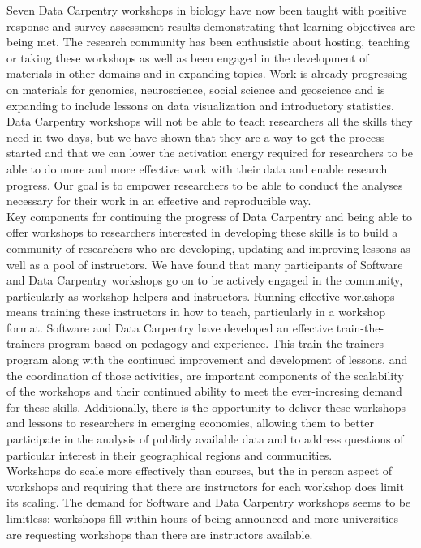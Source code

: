 \documentclass[15]{idcc}
\begin{document}
\begin{itemize}
Seven Data Carpentry workshops in biology have now been taught with positive response and survey
assessment results demonstrating that learning objectives are being met. The research community
has been enthusistic about hosting, teaching or taking these workshops as well as been engaged in
 the development of materials in other domains and in expanding topics. Work is already progressing on materials
for genomics, neuroscience, social science and geoscience and is expanding to include lessons on data visualization and introductory statistics. \\



Data Carpentry workshops will not be able to teach researchers all the skills they need in two days, but we have shown that
they are a way to get the process started and that we can lower the activation energy required for researchers to be
 able to do more and more effective work with their data and enable research progress. Our goal is to empower
researchers to be able to conduct the analyses necessary for their work in an effective
and reproducible way.\\

Key components for continuing the progress of Data Carpentry and being able to offer workshops to researchers interested in developing these
skills is to build a community of researchers who are developing, updating and improving lessons as well as a pool of instructors. We have
found that many participants of Software and Data Carpentry workshops go on to be actively engaged in the community, particularly as workshop
helpers and instructors. Running effective workshops means training these instructors in how to teach, particularly in a workshop format.
Software and Data Carpentry have developed an effective train-the-trainers program based on pedagogy and experience. This train-the-trainers
program along with the continued improvement and development of lessons, and the coordination
 of those activities, are important components of the scalability of the workshops and their continued ability to meet
 the ever-incresing demand for these skills. Additionally, there is the opportunity to deliver these workshops and lessons to researchers in emerging
 economies, allowing them to better participate in the analysis
of publicly available data and to address questions of particular interest in their geographical regions and communities.\\

Workshops do scale more effectively than courses, but the in person aspect of workshops and requiring that there are instructors
 for each workshop does limit its scaling. The demand for Software and Data Carpentry workshops seems to be limitless:  workshops
fill within hours of being announced and more universities are requesting workshops than there are instructors available.\\


\end{itemize}
\end{document}
